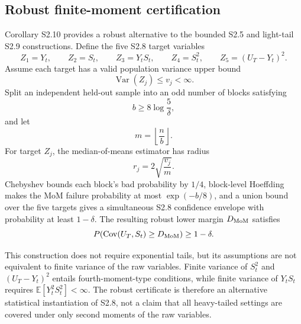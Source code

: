 \subsection{Robust finite-moment certification}

Corollary S2.10 provides a robust alternative to the bounded S2.5 and light-tail S2.9 constructions. Define the five S2.8 target variables
\[
Z_1=Y_t,
\qquad
Z_2=S_t,
\qquad
Z_3=Y_tS_t,
\qquad
Z_4=S_t^2,
\qquad
Z_5=(U_T-Y_t)^2.
\]
Assume each target has a valid population variance upper bound
\[
\operatorname{Var}(Z_j)\le v_j<\infty.
\]
Split an independent held-out sample into an odd number of blocks satisfying
\[
b\ge8\log\frac{5}{\delta},
\]
and let
\[
m=\left\lfloor\frac{n}{b}\right\rfloor.
\]
For target $Z_j$, the median-of-means estimator has radius
\[
r_j=2\sqrt{\frac{v_j}{m}}.
\]
Chebyshev bounds each block's bad probability by $1/4$, block-level Hoeffding makes the MoM failure probability at most $\exp(-b/8)$, and a union bound over the five targets gives a simultaneous S2.8 confidence envelope with probability at least $1-\delta$. The resulting robust lower margin $D_{\rm MoM}$ satisfies
\[
P\!\left(
\operatorname{Cov}(U_T,S_t)\ge D_{\rm MoM}
\right)
\ge1-\delta.
\]

This construction does not require exponential tails, but its assumptions are not equivalent to finite variance of the raw variables. Finite variance of $S_t^2$ and $(U_T-Y_t)^2$ entails fourth-moment-type conditions, while finite variance of $Y_tS_t$ requires $\mathbb E[Y_t^2S_t^2]<\infty$. The robust certificate is therefore an alternative statistical instantiation of S2.8, not a claim that all heavy-tailed settings are covered under only second moments of the raw variables.
